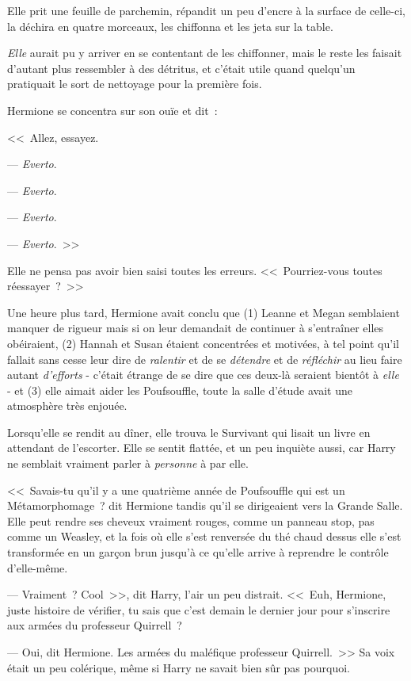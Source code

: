 Elle prit une feuille de parchemin, répandit un peu d'encre à la surface de celle-ci, la déchira en quatre morceaux, les chiffonna et les jeta sur la table.

\emph{Elle} aurait pu y arriver en se contentant de les chiffonner, mais le reste les faisait d'autant plus ressembler à des détritus, et c'était utile quand quelqu'un pratiquait le sort de nettoyage pour la première fois.

Hermione se concentra sur son ouïe et dit~:

<<~Allez, essayez.

--- \emph{Everto}.

--- \emph{Everto}.

--- \emph{Everto}.

--- \emph{Everto}.~>>

Elle ne pensa pas avoir bien saisi toutes les erreurs. <<~Pourriez-vous toutes réessayer~?~>>

Une heure plus tard, Hermione avait conclu que (1) Leanne et Megan semblaient manquer de rigueur mais si on leur demandait de continuer à s'entraîner elles obéiraient, (2) Hannah et Susan étaient concentrées et motivées, à tel point qu'il fallait sans cesse leur dire de \emph{ralentir} et de se \emph{détendre} et de \emph{réfléchir} au lieu faire autant \emph{d'efforts} - c'était étrange de se dire que ces deux-là seraient bientôt à \emph{elle} - et (3) elle aimait aider les Poufsouffle, toute la salle d'étude avait une atmosphère très enjouée.

Lorsqu'elle se rendit au dîner, elle trouva le Survivant qui lisait un livre en attendant de l'escorter. Elle se sentit flattée, et un peu inquiète aussi, car Harry ne semblait vraiment parler à \emph{personne} à par elle.

<<~Savais-tu qu'il y a une quatrième année de Poufsouffle qui est un Métamorphomage~? dit Hermione tandis qu'il se dirigeaient vers la Grande Salle. Elle peut rendre ses cheveux vraiment rouges, comme un panneau stop, pas comme un Weasley, et la fois où elle s'est renversée du thé chaud dessus elle s'est transformée en un garçon brun jusqu'à ce qu'elle arrive à reprendre le contrôle d'elle-même.

--- Vraiment~? Cool~>>, dit Harry, l'air un peu distrait. <<~Euh, Hermione, juste histoire de vérifier, tu sais que c'est demain le dernier jour pour s'inscrire aux armées du professeur Quirrell~?

--- Oui, dit Hermione. Les armées du maléfique professeur Quirrell.~>> Sa voix était un peu colérique, même si Harry ne savait bien sûr pas pourquoi.

